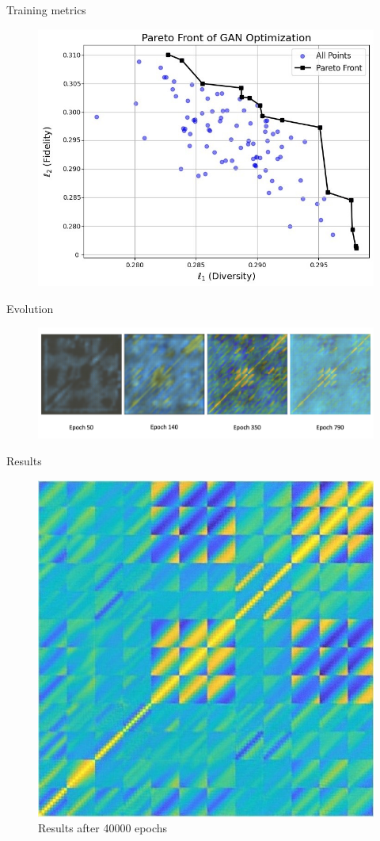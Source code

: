 \documentclass[aspectratio=169,xcolor=dvipsnames]{beamer}
\begin{document}
\begin{frame}{Training metrics}

    \begin{figure}
        \centering
        \includegraphics[width=0.7\linewidth]{pareto.png}
    \end{figure}
\end{frame}

\begin{frame}{Evolution}
    \begin{figure}
        \centering
        \includegraphics[width=0.95\linewidth]{ganEvol.png}
    \end{figure}
\end{frame}


\begin{frame}{Results}
    \begin{figure}
        \centering
        \includegraphics[width=0.35\linewidth]{result.jpeg}
        \caption{Results after 40000 epochs}
        \label{fig:enter-label}
    \end{figure}
\end{frame}
\end{document}
